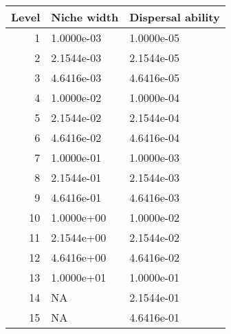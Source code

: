 \begin{longtable}{rll}
\toprule
Level & Niche width & Dispersal ability \\ 
\midrule
1 & 1.0000e-03 & 1.0000e-05 \\ 
2 & 2.1544e-03 & 2.1544e-05 \\ 
3 & 4.6416e-03 & 4.6416e-05 \\ 
4 & 1.0000e-02 & 1.0000e-04 \\ 
5 & 2.1544e-02 & 2.1544e-04 \\ 
6 & 4.6416e-02 & 4.6416e-04 \\ 
7 & 1.0000e-01 & 1.0000e-03 \\ 
8 & 2.1544e-01 & 2.1544e-03 \\ 
9 & 4.6416e-01 & 4.6416e-03 \\ 
10 & 1.0000e+00 & 1.0000e-02 \\ 
11 & 2.1544e+00 & 2.1544e-02 \\ 
12 & 4.6416e+00 & 4.6416e-02 \\ 
13 & 1.0000e+01 & 1.0000e-01 \\ 
14 & NA & 2.1544e-01 \\ 
15 & NA & 4.6416e-01 \\ 
\bottomrule
\end{longtable}

